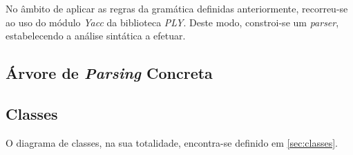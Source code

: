 \documentclass[../relatorio.tex]{subfiles}
\begin{document}

No âmbito de aplicar as regras da gramática definidas anteriormente,
recorreu-se ao uso do módulo \textit{Yacc} da biblioteca \textit{PLY}. 
Deste modo, constroi-se um \textit{parser}, estabelecendo a análise 
sintática a efetuar.

\subsection{Árvore de \textit{Parsing} Concreta}


\subsection{Classes}

O diagrama de classes, na sua totalidade, encontra-se definido em \ref{sec:classes}.







\end{document}
